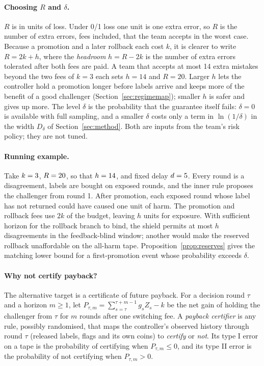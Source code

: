 \documentclass[10pt]{article}
\theoremstyle{plain}
\theoremstyle{definition}
\begin{document}
\paragraph{Choosing $R$ and $\delta$.}
$R$ is in units of loss. Under 0/1 loss one unit is one extra error, so $R$ is the number of extra errors, fees included, that the team accepts in the worst case. Because a promotion and a later rollback each cost $k$, it is clearer to write $R=2k+h$, where the \emph{headroom} $h=R-2k$ is the number of extra errors tolerated after both fees are paid. A team that accepts at most 14 extra mistakes beyond the two fees of $k=3$ each sets $h=14$ and $R=20$. Larger $h$ lets the controller hold a promotion longer before labels arrive and keeps more of the benefit of a good challenger (Section~\ref{sec:regimemap}); smaller $h$ is safer and gives up more. The level $\delta$ is the probability that the guarantee itself fails: $\delta=0$ is available with full sampling, and a smaller $\delta$ costs only a term in $\ln(1/\delta)$ in the width $D_\delta$ of Section~\ref{sec:method}. Both are inputs from the team's risk policy; they are not tuned.

\paragraph{Running example.}\label{par:example}
Take $k=3$, $R=20$, so that $h=14$, and fixed delay $d=5$. Every round is a disagreement, labels are bought on exposed rounds, and the inner rule proposes the challenger from round 1. After promotion, each exposed round whose label has not returned could have caused one unit of harm. The promotion and rollback fees use $2k$ of the budget, leaving $h$ units for exposure. With sufficient horizon for the rollback branch to bind, the shield permits at most $h$ disagreements in the feedback-blind window; another would make the reserved rollback unaffordable on the all-harm tape. Proposition~\ref{prop:reserves} gives the matching lower bound for a first-promotion event whose probability exceeds $\delta$.

\paragraph{Why not certify payback?}
The alternative target is a certificate of future payback. For a decision round $\tau$ and a horizon $m\ge1$, let $P_{\tau,m}=\sum_{s=\tau}^{\tau+m-1}g_sZ_s-k$ be the net gain of holding the challenger from $\tau$ for $m$ rounds after one switching fee. A \emph{payback certifier} is any rule, possibly randomised, that maps the controller's observed history through round $\tau$ (released labels, flags and its own coins) to \emph{certify} or \emph{not}. Its type I error on a tape is the probability of certifying when $P_{\tau,m}\le0$, and its type II error is the probability of not certifying when $P_{\tau,m}>0$.
\end{document}
